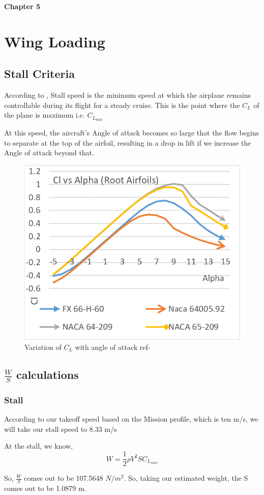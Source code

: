 \documentclass[12 pt]{article}
\begin{document}
\textbf{\Huge{Chapter 5}}

\section{Wing Loading}

\subsection{Stall Criteria}
According to \cite{stall1}, Stall speed is the minimum speed at which the airplane remains controllable during its flight for a steady cruise. This is the point where the $C_L$ of the plane is maximum i.e. $C_{L_{\text{max}}}$

At this speed, the aircraft's Angle of attack becomes so large that the flow begins to separate at the top of the airfoil, resulting in a drop in lift if we increase the Angle of attack beyond that.

\begin{figure}[h]
    \centering
    \includegraphics[width=0.4\linewidth]{Extra pics/Cllvsalpha.png}
    \caption{Variation of $C_L$ with angle of attack ref- \cite{stallpic}}
    \label{Variation of $C_L$ with angle}
\end{figure}

\subsection{ $\frac{W}{S}$ calculations }

\subsubsection{Stall}

According to our takeoff speed based on the Mission profile, which is ten m/s, we will take our stall speed to 8.33 m/s

At the stall, we know,
$$W = \frac{1}{2} \rho V^2 S C_{L_{max}} $$

So, $\frac{W}{S}$ comes out to be 107.5648 $N/m^2$. So, taking our estimated weight, the S comes out to be 1.0879 m.
\end{document}
